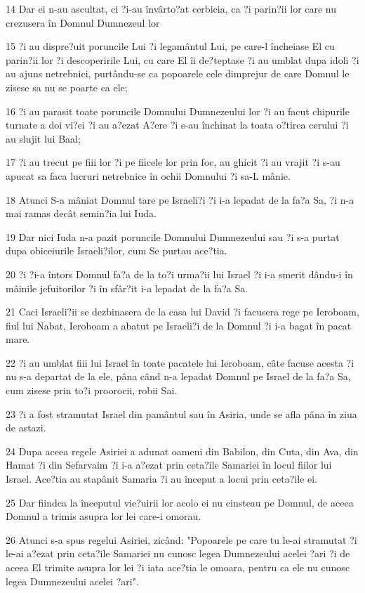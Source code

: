 \par 14 Dar ei n-au ascultat, ci ?i-au învârto?at cerbicia, ca ?i parin?ii lor care nu crezusera în Domnul Dumnezeul lor
\par 15 ?i au dispre?uit poruncile Lui ?i legamântul Lui, pe care-l încheiase El cu parin?ii lor ?i descoperirile Lui, cu care El îi de?teptase ?i au umblat dupa idoli ?i au ajuns netrebnici, purtându-se ca popoarele cele dimprejur de care Domnul le zisese sa nu se poarte ca ele;
\par 16 ?i au parasit toate poruncile Domnului Dumnezeului lor ?i au facut chipurile turnate a doi vi?ei ?i au a?ezat A?ere ?i s-au închinat la toata o?tirea cerului ?i au slujit lui Baal;
\par 17 ?i au trecut pe fiii lor ?i pe fiicele lor prin foc, au ghicit ?i au vrajit ?i s-au apucat sa faca lucruri netrebnice în ochii Domnului ?i sa-L mânie.
\par 18 Atunci S-a mâniat Domnul tare pe Israeli?i ?i i-a lepadat de la fa?a Sa, ?i n-a mai ramas decât semin?ia lui Iuda.
\par 19 Dar nici Iuda n-a pazit poruncile Domnului Dumnezeului sau ?i s-a purtat dupa obiceiurile Israeli?ilor, cum Se purtau ace?tia.
\par 20 ?i ?i-a întors Domnul fa?a de la to?i urma?ii lui Israel ?i i-a smerit dându-i în mâinile jefuitorilor ?i în sfâr?it i-a lepadat de la fa?a Sa.
\par 21 Caci Israeli?ii se dezbinasera de la casa lui David ?i facusera rege pe Ieroboam, fiul lui Nabat, Ieroboam a abatut pe Israeli?i de la Domnul ?i i-a bagat în pacat mare.
\par 22 ?i au umblat fiii lui Israel în toate pacatele lui Ieroboam, câte facuse acesta ?i nu s-a departat de la ele, pâna când n-a lepadat Domnul pe Israel de la fa?a Sa, cum zisese prin to?i proorocii, robii Sai.
\par 23 ?i a fost stramutat Israel din pamântul sau în Asiria, unde se afla pâna în ziua de astazi.
\par 24 Dupa aceea regele Asiriei a adunat oameni din Babilon, din Cuta, din Ava, din Hamat ?i din Sefarvaim ?i i-a a?ezat prin ceta?ile Samariei în locul fiilor lui Israel. Ace?tia au stapânit Samaria ?i au început a locui prin ceta?ile ei.
\par 25 Dar fiindca la începutul vie?uirii lor acolo ei nu cinsteau pe Domnul, de aceea Domnul a trimis asupra lor lei care-i omorau.
\par 26 Atunci s-a spus regelui Asiriei, zicând: "Popoarele pe care tu le-ai stramutat ?i le-ai a?ezat prin ceta?ile Samariei nu cunosc legea Dumnezeului acelei ?ari ?i de aceea El trimite asupra lor lei ?i iata ace?tia le omoara, pentru ca ele nu cunosc legea Dumnezeului acelei ?ari".
